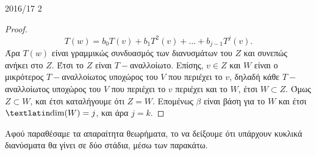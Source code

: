 \documentclass[a4paper,11pt]{article}
\begin{document}
\begin{solution}{2016/17 2}
\begin{proof}
        \begin{equation*}
            T(w) = b_0T(v) + b_1T^2(v) + \dots + b_{j-1}T^{j}(v).
        \end{equation*}
        Άρα \( T(w) \) είναι γραμμικώς συνδυασμός των διανυσμάτων του \( Z \)
        και συνεπώς ανήκει στο \( Z \). Έτσι το \( Z \) είναι \(T-\)αναλλοίωτο.
        Επίσης, \( v \in Z \) και \( W \) είναι ο μικρότερος \(T-\)αναλλοίωτος
        υποχώρος του \( V \) που περιέχει το \( v \), δηλαδή κάθε \(T-\)αναλλοίωτος
        υποχώρος του \( V \) που περιέχει το \( v \) περιέχει και το \( W \),
        έτσι \( W \subset Z \).  Όμως \( Z \subset W \), και έτσι καταλήγουμε ότι
        \( Z = W \). Επομένως \( \beta \) είναι βάση για το \( W \) και έτσι
        \( \text{\tl{dim}}(W) = j \), και άρα \( j = k \).
    \end{proof}
    Αφού παραθέσαμε τα απαραίτητα θεωρήματα, το να δείξουμε ότι υπάρχουν κυκλικά
    διανύσματα θα γίνει σε δύο στάδια, μέσω των παρακάτω.


\end{solution}
\end{document}
